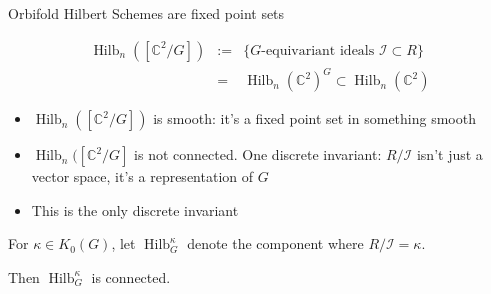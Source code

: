 \documentclass{beamer}
\DeclareMathOperator{\Hilb}{Hilb}
\newcommand{\C}{\mathbb{C}}
\begin{document}
\begin{frame}{Orbifold Hilbert Schemes are fixed point sets}


\begin{eqnarray*}
\Hilb_n([\C^2/G])&:=&\{\textrm{$G$-equivariant ideals } \mathcal{I}\subset R\} \\
&=&\Hilb_n(\C^2)^G\subset \Hilb_n(\C^2)
\end{eqnarray*}
\begin{itemize}
\item $\Hilb_n([\C^2/G])$ is smooth: it's a fixed point set in something smooth
\item $\Hilb_n([\C^2/G]$ is not connected.  One discrete invariant: $R/\mathcal{I}$ isn't just a vector space, it's a representation of $G$  
\item This is the only discrete invariant
\end{itemize}

For $\kappa\in K_0(G)$, let $\Hilb^\kappa_G$ denote the component where $R/\mathcal{I}=\kappa$.

Then $\Hilb^\kappa_G$ is connected.
\end{frame}
\end{document}
